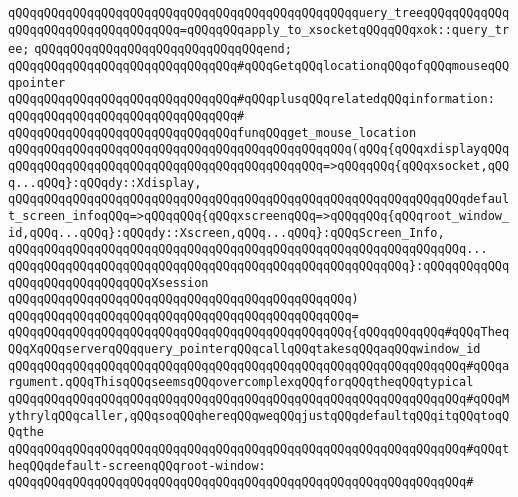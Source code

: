 \verb|qQQqqQQqqQQqqQQqqQQqqQQqqQQqqQQqqQQqqQQqqQQqqQQqquery_treeqQQqqQQqqQQqqQQqqQQqqQQqqQQqqQQqqQQq=qQQqqQQqapply_to_xsocketqQQqqQQqxok::query_tree;|\newline
\newline
\verb|qQQqqQQqqQQqqQQqqQQqqQQqqQQqqQQqend;|\newline
\newline
\verb|qQQqqQQqqQQqqQQqqQQqqQQqqQQqqQQq#qQQqGetqQQqlocationqQQqofqQQqmouseqQQqpointer|\newline
\verb|qQQqqQQqqQQqqQQqqQQqqQQqqQQqqQQq#qQQqplusqQQqrelatedqQQqinformation:|\newline
\verb|qQQqqQQqqQQqqQQqqQQqqQQqqQQqqQQq#|\newline
\verb|qQQqqQQqqQQqqQQqqQQqqQQqqQQqqQQqfunqQQqget_mouse_location|\newline
\verb|qQQqqQQqqQQqqQQqqQQqqQQqqQQqqQQqqQQqqQQqqQQqqQQq(qQQq{qQQqxdisplayqQQqqQQqqQQqqQQqqQQqqQQqqQQqqQQqqQQqqQQqqQQqqQQq=>qQQqqQQq{qQQqxsocket,qQQq...qQQq}:qQQqdy::Xdisplay,|\newline
\verb|qQQqqQQqqQQqqQQqqQQqqQQqqQQqqQQqqQQqqQQqqQQqqQQqqQQqqQQqqQQqqQQqdefault_screen_infoqQQq=>qQQqqQQq{qQQqxscreenqQQq=>qQQqqQQq{qQQqroot_window_id,qQQq...qQQq}:qQQqdy::Xscreen,qQQq...qQQq}:qQQqScreen_Info,|\newline
\verb|qQQqqQQqqQQqqQQqqQQqqQQqqQQqqQQqqQQqqQQqqQQqqQQqqQQqqQQqqQQqqQQq...|\newline
\verb|qQQqqQQqqQQqqQQqqQQqqQQqqQQqqQQqqQQqqQQqqQQqqQQqqQQqqQQq}:qQQqqQQqqQQqqQQqqQQqqQQqqQQqqQQqXsession|\newline
\verb|qQQqqQQqqQQqqQQqqQQqqQQqqQQqqQQqqQQqqQQqqQQqqQQq)|\newline
\verb|qQQqqQQqqQQqqQQqqQQqqQQqqQQqqQQqqQQqqQQqqQQqqQQq=|\newline
\verb|qQQqqQQqqQQqqQQqqQQqqQQqqQQqqQQqqQQqqQQqqQQqqQQq{qQQqqQQqqQQq#qQQqTheqQQqXqQQqserverqQQqquery_pointerqQQqcallqQQqtakesqQQqaqQQqwindow_id|\newline
\verb|qQQqqQQqqQQqqQQqqQQqqQQqqQQqqQQqqQQqqQQqqQQqqQQqqQQqqQQqqQQqqQQq#qQQqargument.qQQqThisqQQqseemsqQQqovercomplexqQQqforqQQqtheqQQqtypical|\newline
\verb|qQQqqQQqqQQqqQQqqQQqqQQqqQQqqQQqqQQqqQQqqQQqqQQqqQQqqQQqqQQqqQQq#qQQqMythrylqQQqcaller,qQQqsoqQQqhereqQQqweqQQqjustqQQqdefaultqQQqitqQQqtoqQQqthe|\newline
\verb|qQQqqQQqqQQqqQQqqQQqqQQqqQQqqQQqqQQqqQQqqQQqqQQqqQQqqQQqqQQqqQQq#qQQqtheqQQqdefault-screenqQQqroot-window:|\newline
\verb|qQQqqQQqqQQqqQQqqQQqqQQqqQQqqQQqqQQqqQQqqQQqqQQqqQQqqQQqqQQqqQQq#|\newline
